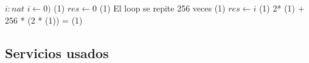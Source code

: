   {
    \var $i : nat$
    \State $i \gets 0)$                									\comment \bigo(1)
    \State $res \gets 0$												\comment \bigo(1)
     	\Statex             \comment El loop se repite 256 veces
 		                     			\comment \bigo(1)
		 	\State $res \gets i$										\comment \bigo(1)
     	 \EndIf	 													
    \EndWhile						
}{  2* \bigo(1) + 256 * (2 * \bigo(1))  = \bigo(1) }


\subsection{Servicios usados}


